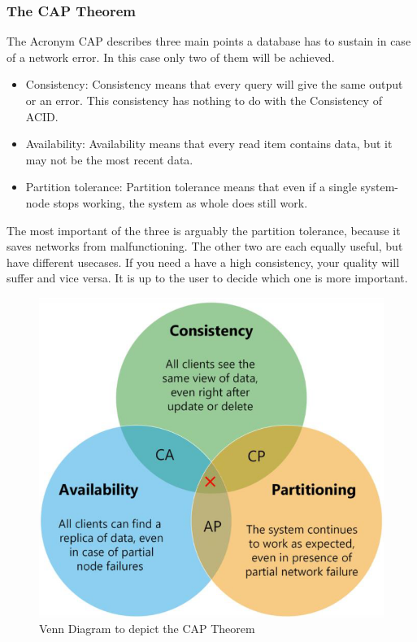 \subsubsection{The CAP Theorem}
The Acronym CAP describes three main points a database has to sustain in case of a network error. In this case only two of them will be achieved. 
\begin{itemize}
    \item Consistency: Consistency means that every query will give the same output or an error. This consistency has nothing to do with the Consistency of ACID.
    \item Availability: Availability means that every read item contains data, but it may not be the most recent data.
    \item Partition tolerance: Partition tolerance means that even if a single system-node stops working, the system as whole does still work.
\end{itemize}
    The most important of the three is arguably the partition tolerance, because it saves networks from malfunctioning. The other two are each equally useful, but have different usecases.
     If you need a have a high consistency, your quality will suffer and vice versa. It is up to the user to decide which one is more important. 
\begin{figure}[h]
    \centering
    \includegraphics[width=0.4\linewidth]{images/CAP_Theorem.png}
    \caption{Venn Diagram to depict the CAP Theorem}
    \label{fig:FirstIteration-general}
    \end{figure}